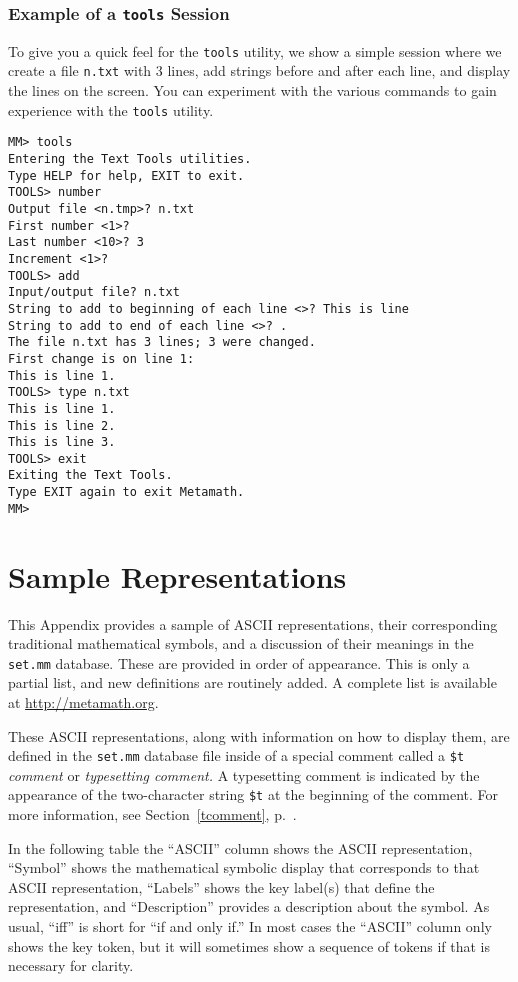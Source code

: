 \subsection{Example of a \texttt{tools} Session}

To give you a quick feel for the \texttt{tools} utility, we show a
simple session where we create a file \texttt{n.txt} with 3 lines, add
strings before and after each line, and display the lines on the screen.
You can experiment with the various commands to gain experience with the
\texttt{tools} utility.

\begin{verbatim}
MM> tools
Entering the Text Tools utilities.
Type HELP for help, EXIT to exit.
TOOLS> number
Output file <n.tmp>? n.txt
First number <1>?
Last number <10>? 3
Increment <1>?
TOOLS> add
Input/output file? n.txt
String to add to beginning of each line <>? This is line
String to add to end of each line <>? .
The file n.txt has 3 lines; 3 were changed.
First change is on line 1:
This is line 1.
TOOLS> type n.txt
This is line 1.
This is line 2.
This is line 3.
TOOLS> exit
Exiting the Text Tools.
Type EXIT again to exit Metamath.
MM>
\end{verbatim}



\appendix
\chapter{Sample Representations}
\label{ASCII}

This Appendix provides a sample of {\sc ASCII} representations,
their corresponding traditional mathematical symbols,
and a discussion of their meanings
in the \texttt{set.mm} database.
These are provided in order of appearance.
This is only a partial list, and new definitions are routinely added.
A complete list is available at \url{http://metamath.org}.

These {\sc ASCII} representations, along
with information on how to display them,
are defined in the \texttt{set.mm} database file inside of
a special comment called a \texttt{\$t} {\em
comment} or {\em typesetting
comment.}
A typesetting comment
is indicated by the appearance of the
two-character string \texttt{\$t} at the beginning of the comment.
For more information,
see Section~\ref{tcomment}, p.~\pageref{tcomment}.

In the following table the ``{\sc ASCII}'' column shows the {\sc ASCII}
representation,
``Symbol'' shows the mathematical symbolic display
that corresponds to that {\sc ASCII} representation, ``Labels'' shows
the key label(s) that define the representation, and
``Description'' provides a description about the symbol.
As usual, ``iff'' is short for ``if and only if.''
In most cases the ``{\sc ASCII}'' column only shows
the key token, but it will sometimes show a sequence of tokens
if that is necessary for clarity.

